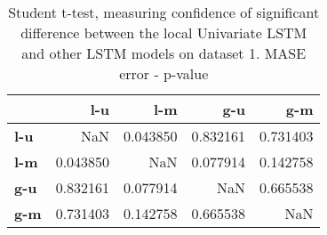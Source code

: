 \begin{table}[h]
\centering
\caption{Student t-test, measuring confidence of significant difference between the local Univariate LSTM and other LSTM models on dataset 1. MASE error - p-value}
\label{table:ttest-p-values-lstm-experiments-MASE-dataset-1}
\begin{tabular}{lrrrr}
\toprule
{} &       l-u &       l-m &       g-u &       g-m \\
\midrule
\textbf{l-u} &       NaN &  0.043850 &  0.832161 &  0.731403 \\
\textbf{l-m} &  0.043850 &       NaN &  0.077914 &  0.142758 \\
\textbf{g-u} &  0.832161 &  0.077914 &       NaN &  0.665538 \\
\textbf{g-m} &  0.731403 &  0.142758 &  0.665538 &       NaN \\
\bottomrule
\end{tabular}
\end{table}
